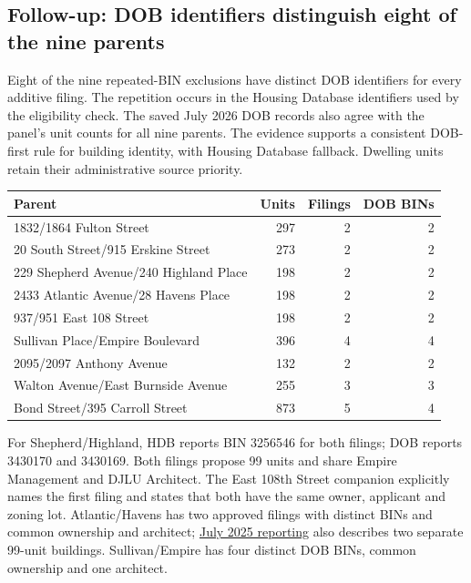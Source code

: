 \clearpage
\subsection*{Follow-up: DOB identifiers distinguish eight of the nine parents}

Eight of the nine repeated-BIN exclusions have distinct DOB identifiers for
every additive filing. The repetition occurs in the Housing Database
identifiers used by the eligibility check. The saved July 2026 DOB records
also agree with the panel's unit counts for all nine parents. The evidence
supports a consistent DOB-first rule for building identity, with Housing
Database fallback. Dwelling units retain their administrative source priority.

\begin{center}
\small
\begin{tabular}{lrrr}
\hline
Parent & Units & Filings & DOB BINs \\
\hline
1832/1864 Fulton Street & 297 & 2 & 2 \\
20 South Street/915 Erskine Street & 273 & 2 & 2 \\
229 Shepherd Avenue/240 Highland Place & 198 & 2 & 2 \\
2433 Atlantic Avenue/28 Havens Place & 198 & 2 & 2 \\
937/951 East 108 Street & 198 & 2 & 2 \\
Sullivan Place/Empire Boulevard & 396 & 4 & 4 \\
2095/2097 Anthony Avenue & 132 & 2 & 2 \\
Walton Avenue/East Burnside Avenue & 255 & 3 & 3 \\
Bond Street/395 Carroll Street & 873 & 5 & 4 \\
\hline
\end{tabular}
\end{center}

For Shepherd/Highland, HDB reports BIN 3256546 for both filings; DOB reports
3430170 and 3430169. Both filings propose 99 units and share Empire Management
and DJLU Architect. The East 108th Street companion explicitly names the
first filing and states that both have the same owner, applicant and zoning
lot. Atlantic/Havens has two approved filings with distinct BINs and common
ownership and architect; \href{https://commercialobserver.com/2025/07/developer-apartment-buildings-bed-stuy/}{July 2025 reporting}
also describes two separate 99-unit buildings. Sullivan/Empire has four distinct
DOB BINs, common ownership and one architect.

